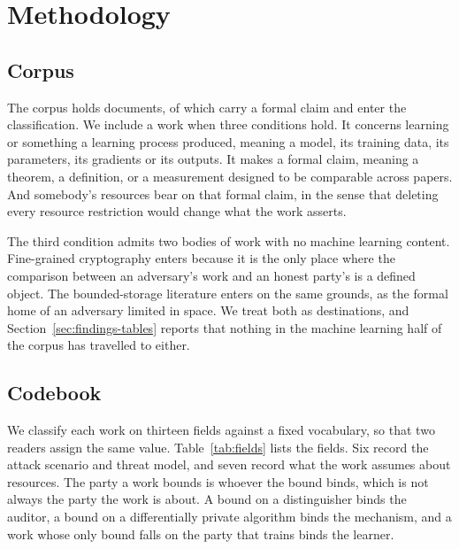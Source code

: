 \section{Methodology}
\label{sec:method}

\subsection{Corpus}

The corpus holds \NumPapers{} documents, of which \NumSources{} carry a formal
claim and enter the classification. We include a work when three conditions
hold. It concerns learning or something a learning process produced, meaning a
model, its training data, its parameters, its gradients or its outputs. It
makes a formal claim, meaning a theorem, a definition, or a measurement
designed to be comparable across papers. And somebody's resources bear on that
formal claim, in the sense that deleting every resource restriction would
change what the work asserts.

The third condition admits two bodies of work with no machine learning
content. Fine-grained cryptography enters because it is the only place where
the comparison between an adversary's work and an honest party's is a defined
object. The bounded-storage literature enters on the same grounds, as the
formal home of an adversary limited in space. We treat both as destinations,
and Section~\ref{sec:findings-tables} reports that nothing in the machine
learning half of the corpus has travelled to either.

\subsection{Codebook}

We classify each work on thirteen fields against a fixed vocabulary, so that
two readers assign the same value. Table~\ref{tab:fields} lists the fields.
Six record the attack scenario and threat model, and seven record what the
work assumes about resources. The party a work bounds is whoever the bound
binds, which is not always the party the work is about. A bound on a
distinguisher binds the auditor, a bound on a differentially private algorithm
binds the mechanism, and a work whose only bound falls on the party that
trains binds the learner.

